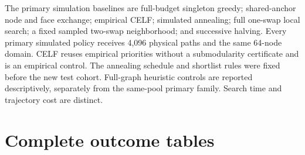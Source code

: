 \documentclass[preprint,11pt,sort&compress]{elsarticle}
\begin{document}
The primary simulation baselines are full-budget singleton greedy; shared-anchor node and face exchange; empirical CELF; simulated annealing; full one-swap local search; a fixed sampled two-swap neighborhood; and successive halving. Every primary simulated policy receives 4,096 physical paths and the same 64-node domain. CELF reuses empirical priorities without a submodularity certificate and is an empirical control. The annealing schedule and shortlist rules were fixed before the new test cohort. Full-graph heuristic controls are reported descriptively, separately from the same-pool primary family. Search time and trajectory cost are distinct.

\FloatBarrier\section{Complete outcome tables}
\end{document}
